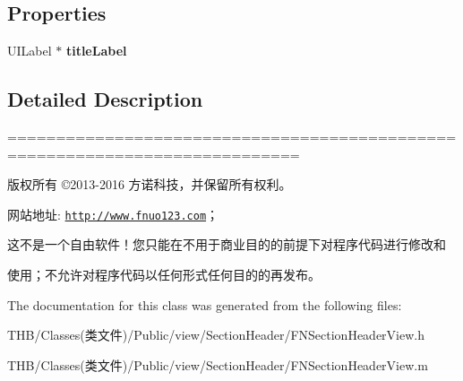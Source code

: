 \subsection*{Properties}
\begin{DoxyCompactItemize}
\item 
\mbox{\label{interface_f_n_section_header_view_ab6c624ccb052947bf47d76015040b799}} 
U\+I\+Label $\ast$ {\bfseries title\+Label}
\end{DoxyCompactItemize}


\subsection{Detailed Description}
============================================================================

版权所有 ©2013-\/2016 方诺科技，并保留所有权利。

网站地址\+: \href{http://www.fnuo123.com}{\tt http\+://www.\+fnuo123.\+com}； 



这不是一个自由软件！您只能在不用于商业目的的前提下对程序代码进行修改和

使用；不允许对程序代码以任何形式任何目的的再发布。 

 

The documentation for this class was generated from the following files\+:\begin{DoxyCompactItemize}
\item 
T\+H\+B/\+Classes(类文件)/\+Public/view/\+Section\+Header/F\+N\+Section\+Header\+View.\+h\item 
T\+H\+B/\+Classes(类文件)/\+Public/view/\+Section\+Header/F\+N\+Section\+Header\+View.\+m\end{DoxyCompactItemize}
